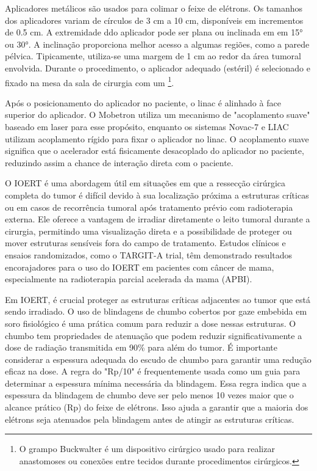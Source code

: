 \documentclass[11pt,a4paper]{article}
\begin{document}
	Aplicadores metálicos são usados para colimar o feixe de elétrons. Os tamanhos dos aplicadores variam de círculos de 3 cm a 10 cm, disponíveis em incrementos de 0.5 cm. A extremidade ddo aplicador pode ser plana ou inclinada em em \ang{15} ou \ang{30}. A inclinação proporciona melhor acesso a algumas regiões, como a parede pélvica. Tipicamente, utiliza-se uma margem de 1 cm ao redor da área tumoral envolvida. Durante o procedimento, o aplicador adequado (estéril) é selecionado e fixado na mesa da sala de cirurgia com um \footnote{O grampo Buckwalter é um dispositivo cirúrgico usado para realizar anastomoses ou conexões entre tecidos durante procedimentos cirúrgicos.}.

	Após o posicionamento do aplicador no paciente, o linac é alinhado à face superior do aplicador. O Mobetron utiliza um mecanismo de "acoplamento suave" baseado em laser para esse propósito, enquanto os sistemas Novac-7 e LIAC utilizam acoplamento rígido para fixar o aplicador no linac.  O acoplamento suave significa que o acelerador está fisicamente desacoplado do aplicador no paciente, reduzindo assim a chance de interação direta com o paciente. 
	
	O IOERT é uma abordagem útil em situações em que a ressecção cirúrgica completa do tumor é difícil devido à sua localização próxima a estruturas críticas ou em casos de recorrência tumoral após tratamento prévio com radioterapia externa. Ele oferece a vantagem de irradiar diretamente o leito tumoral durante a cirurgia, permitindo uma visualização direta e a possibilidade de proteger ou mover estruturas sensíveis fora do campo de tratamento. Estudos clínicos e ensaios randomizados, como o TARGIT-A trial, têm demonstrado resultados encorajadores para o uso do IOERT em pacientes com câncer de mama, especialmente na radioterapia parcial acelerada da mama (APBI).

	Em IOERT, é crucial proteger as estruturas críticas adjacentes ao tumor que está sendo irradiado. O uso de blindagens de chumbo cobertos por gaze embebida em soro fisiológico é uma prática comum para reduzir a dose nessas estruturas. O chumbo tem propriedades de atenuação que podem reduzir significativamente a dose de radiação transmitida em 90\% para além do tumor. É importante considerar a espessura adequada do escudo de chumbo para garantir uma redução eficaz na dose. A regra do "Rp/10" é frequentemente usada como um guia para determinar a espessura mínima necessária da blindagem. Essa regra indica que a espessura da blindagem de chumbo deve ser pelo menos 10 vezes maior que o alcance prático (Rp) do feixe de elétrons. Isso ajuda a garantir que a maioria dos elétrons seja atenuados pela blindagem antes de atingir as estruturas críticas.
\end{document}
